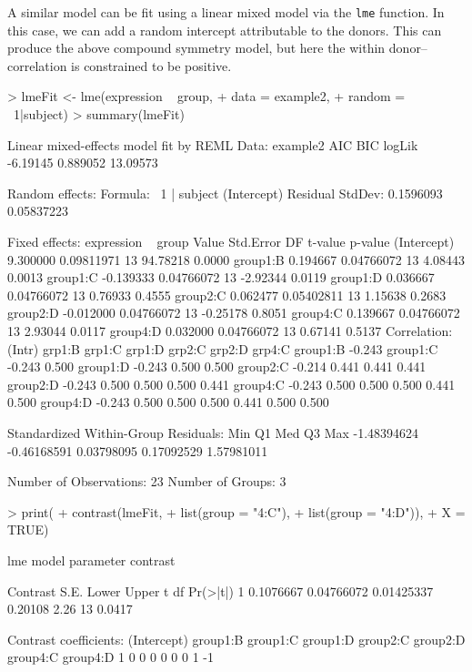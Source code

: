 \documentclass[12pt]{article}
\newcommand{\code}[1]{\mbox{\footnotesize\color{darkblue}\texttt{#1}}}
\renewenvironment{Schunk}{\vspace{\topsep}}{\vspace{\topsep}}
\begin{document}
A similar model can be fit using a linear mixed model via the \code{lme} function. In this case, we can add a random intercept attributable to the donors. This can produce the above compound symmetry model, but here the within donor--correlation is constrained to be positive.
\begin{Schunk}
\begin{Sinput}
> lmeFit <-  lme(expression ~ group, 
+                data = example2, 
+                random = ~1|subject)
> summary(lmeFit)
\end{Sinput}
\begin{Soutput}
Linear mixed-effects model fit by REML
 Data: example2 
       AIC      BIC   logLik
  -6.19145 0.889052 13.09573

Random effects:
 Formula: ~1 | subject
        (Intercept)   Residual
StdDev:   0.1596093 0.05837223

Fixed effects: expression ~ group 
                Value  Std.Error DF  t-value p-value
(Intercept)  9.300000 0.09811971 13 94.78218  0.0000
group1:B     0.194667 0.04766072 13  4.08443  0.0013
group1:C    -0.139333 0.04766072 13 -2.92344  0.0119
group1:D     0.036667 0.04766072 13  0.76933  0.4555
group2:C     0.062477 0.05402811 13  1.15638  0.2683
group2:D    -0.012000 0.04766072 13 -0.25178  0.8051
group4:C     0.139667 0.04766072 13  2.93044  0.0117
group4:D     0.032000 0.04766072 13  0.67141  0.5137
 Correlation: 
         (Intr) grp1:B grp1:C grp1:D grp2:C grp2:D grp4:C
group1:B -0.243                                          
group1:C -0.243  0.500                                   
group1:D -0.243  0.500  0.500                            
group2:C -0.214  0.441  0.441  0.441                     
group2:D -0.243  0.500  0.500  0.500  0.441              
group4:C -0.243  0.500  0.500  0.500  0.441  0.500       
group4:D -0.243  0.500  0.500  0.500  0.441  0.500  0.500

Standardized Within-Group Residuals:
        Min          Q1         Med          Q3         Max 
-1.48394624 -0.46168591  0.03798095  0.17092529  1.57981011 

Number of Observations: 23
Number of Groups: 3 
\end{Soutput}
\begin{Sinput}
> print(
+       contrast(lmeFit, 
+                list(group = "4:C"),
+                list(group = "4:D")),
+       X = TRUE)        
\end{Sinput}
\begin{Soutput}
lme model parameter contrast

   Contrast       S.E.      Lower   Upper    t df Pr(>|t|)
1 0.1076667 0.04766072 0.01425337 0.20108 2.26 13   0.0417

Contrast coefficients:
  (Intercept) group1:B group1:C group1:D group2:C group2:D group4:C group4:D
1           0        0        0        0        0        0        1       -1
\end{Soutput}
\end{Schunk}
\end{document}
